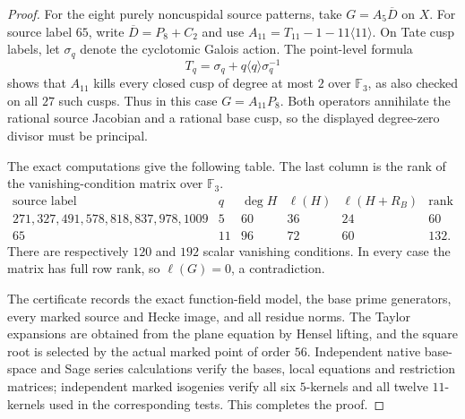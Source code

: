 \begin{proof}
For the eight purely noncuspidal source patterns, take
$G=A_5\overline D$ on $X$. For source label $65$, write
$\overline D=P_8+C_2$ and use
$A_{11}=T_{11}-1-11\langle11\rangle$.
On Tate cusp labels, let $\sigma_q$ denote the cyclotomic Galois
action. The point-level formula
\[
       T_q=\sigma_q+q\langle q\rangle\sigma_q^{-1}
\]
shows that $A_{11}$ kills every closed cusp of degree at most
$2$ over $\mathbb F_3$, as also checked on all $27$ such cusps.
Thus in this case $G=A_{11}P_8$. Both operators annihilate the
rational source Jacobian and a rational base cusp, so the
displayed degree-zero divisor must be principal.

The exact computations give the following table. The last
column is the rank of the vanishing-condition matrix over
$\mathbb F_3$.
\[
\begin{array}{c|r|r|r|r|r}
 \text{source label}&q&\deg H&\ell(H)&\ell(H+R_B)&\text{rank}\\\hline
 271,327,491,578,818,837,978,1009&5&60&36&24&60\\
 65&11&96&72&60&132.
\end{array}
\]
There are respectively $120$ and $192$ scalar vanishing
conditions. In every case the matrix has full row rank, so
$\ell(G)=0$, a contradiction.

The certificate records the exact function-field model, the
base prime generators, every marked source and Hecke image,
and all residue norms. The Taylor expansions are obtained
from the plane equation by Hensel lifting, and the square root
is selected by the actual marked point of order $56$.
Independent native base-space and Sage series calculations
verify the bases, local equations and restriction matrices;
independent marked isogenies verify all six $5$-kernels and all
twelve $11$-kernels used in the corresponding tests.
This completes the proof.
\end{proof}
